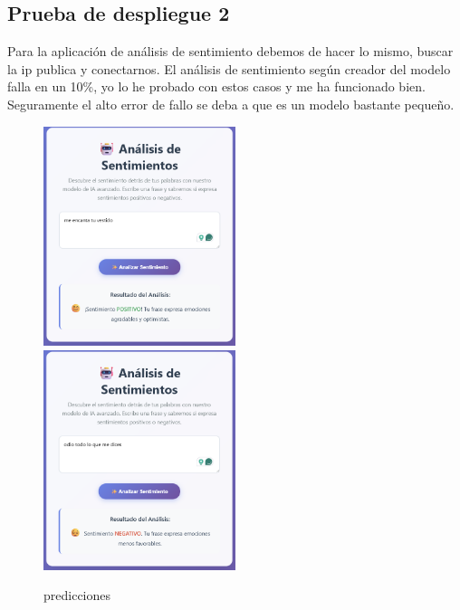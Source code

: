 \documentclass{article}
\begin{document}
	\subsection{Prueba de despliegue 2}

	Para la aplicación de análisis de sentimiento debemos de hacer lo mismo, buscar la ip publica y conectarnos. El análisis de sentimiento según creador del modelo falla en un 10\%, yo lo he probado con estos casos y me ha funcionado bien. Seguramente el alto error de fallo se deba a que es un modelo bastante pequeño.

	\begin{figure}[H]

	\includegraphics[width=0.5\textwidth]{prueba2.png}
	\includegraphics[width=0.5\textwidth]{prueba3.png}
	\caption{predicciones}
	\end{figure}
\end{document}
